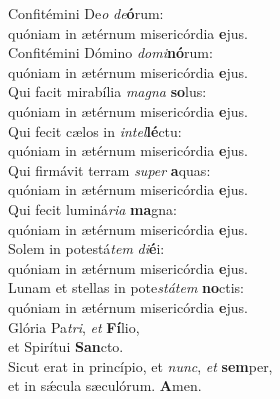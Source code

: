 \evenverse Confitémini De\textit{o} \textit{de}\textbf{ó}rum:~\*\\
\evenverse quóniam in ætérnum misericórdia \textbf{e}jus.\\
\oddverse Confitémini Dómino \textit{do}\textit{mi}\textbf{nó}rum:~\*\\
\oddverse quóniam in ætérnum misericórdia \textbf{e}jus.\\
\evenverse Qui facit mirabília \textit{ma}\textit{gna} \textbf{so}lus:~\*\\
\evenverse quóniam in ætérnum misericórdia \textbf{e}jus.\\
\oddverse Qui fecit cælos in \textit{in}\textit{tel}\textbf{lé}ctu:~\*\\
\oddverse quóniam in ætérnum misericórdia \textbf{e}jus.\\
\evenverse Qui firmávit terram \textit{su}\textit{per} \textbf{a}quas:~\*\\
\evenverse quóniam in ætérnum misericórdia \textbf{e}jus.\\
\oddverse Qui fecit luminá\textit{ri}\textit{a} \textbf{ma}gna:~\*\\
\oddverse quóniam in ætérnum misericórdia \textbf{e}jus.\\
\evenverse Solem in potestá\textit{tem} \textit{di}\textbf{é}i:~\*\\
\evenverse quóniam in ætérnum misericórdia \textbf{e}jus.\\
\oddverse Lunam et stellas in pote\textit{stá}\textit{tem} \textbf{no}ctis:~\*\\
\oddverse quóniam in ætérnum misericórdia \textbf{e}jus.\\
\evenverse Glória Pa\textit{tri}, \textit{et} \textbf{Fí}lio,~\*\\
\evenverse et Spirítui \textbf{San}cto.\\
\oddverse Sicut erat in princípio, et \textit{nunc}, \textit{et} \textbf{sem}per,~\*\\
\oddverse et in sǽcula sæculórum. \textbf{A}men.\\
